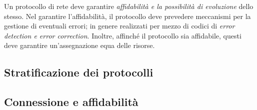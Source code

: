 \documentclass{subfiles}
\begin{document}
Un protocollo di rete deve garantire \emph{affidabilità \emph{e la possibilità di} evoluzione} dello stesso.
Nel garantire l'affidabilità, il protocollo deve prevedere meccanismi per la gestione di eventuali errori;
in genere realizzati per mezzo di codici di \emph{error detection \emph{e} error correction}.
Inoltre, affinché il protocollo sia affidabile, questi deve garantire un'assegnazione equa delle risorse.

\subsection{Stratificazione dei protocolli}


\subsection{Connessione e affidabilità}

\end{document}
